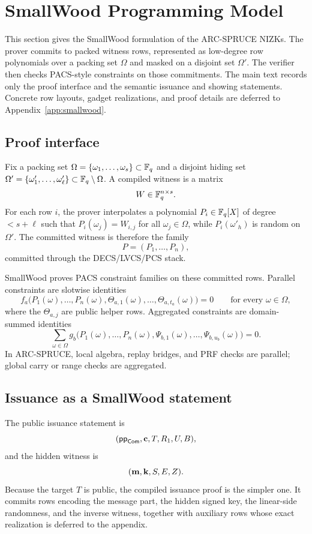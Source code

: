 \section{SmallWood Programming Model}
\label{sec:smallwood-model}
\label{sec:smallwood}

This section gives the SmallWood formulation of the ARC-SPRUCE NIZKs. The prover commits to packed witness rows, represented as low-degree row polynomials over a packing set \(\Omega\) and masked on a disjoint set \(\Omega'\). The verifier then checks PACS-style constraints on those commitments. The main text records only the proof interface and the semantic issuance and showing statements. Concrete row layouts, gadget realizations, and proof details are deferred to Appendix~\ref{app:smallwood}.

\subsection{Proof interface}
\label{subsec:smallwood-interface}
Fix a packing set \(\Omega=\{\omega_1,\ldots,\omega_s\}\subset \mathbb{F}_q\) and a disjoint hiding set
\(\Omega'=\{\omega'_1,\ldots,\omega'_\ell\}\subset \mathbb{F}_q\setminus\Omega\). A compiled witness is a matrix
\[
W\in\mathbb{F}_q^{n\times s}.
\]
For each row \(i\), the prover interpolates a polynomial \(P_i\in\mathbb{F}_q[X]\) of degree \(<s+\ell\) such that \(P_i(\omega_j)=W_{i,j}\) for all \(\omega_j\in\Omega\), while \(P_i(\omega'_h)\) is random on \(\Omega'\). The committed witness is therefore the family
\[
P=(P_1,\ldots,P_n),
\]
committed through the DECS/LVCS/PCS stack.

SmallWood proves PACS constraint families on these committed rows. Parallel constraints are slotwise identities
\[
f_a\!\bigl(P_1(\omega),\ldots,P_n(\omega),\Theta_{a,1}(\omega),\ldots,\Theta_{a,t_a}(\omega)\bigr)=0
\qquad\text{for every }\omega\in\Omega,
\]
where the \(\Theta_{a,j}\) are public helper rows. Aggregated constraints are domain-summed identities
\[
\sum_{\omega\in\Omega}
g_b\!\bigl(P_1(\omega),\ldots,P_n(\omega),\Psi_{b,1}(\omega),\ldots,\Psi_{b,u_b}(\omega)\bigr)=0.
\]
In ARC-SPRUCE, local algebra, replay bridges, and PRF checks are parallel; global carry or range checks are aggregated.

\subsection{Issuance as a SmallWood statement}
\label{subsec:smallwood-issuance}
\label{subsec:presign-compiled}
The public issuance statement is
\[
(\mathsf{pp}_{\mathsf{Com}},\mathbf{c},T,R_1,U,B),
\]
and the hidden witness is
\[
(\mathbf{m},\mathbf{k},S,E,Z).
\]
Because the target \(T\) is public, the compiled issuance proof is the simpler one. It commits rows encoding the
message part, the hidden signed key, the linear-side randomness, and the inverse witness, together with auxiliary rows
whose exact realization is deferred to the appendix.

